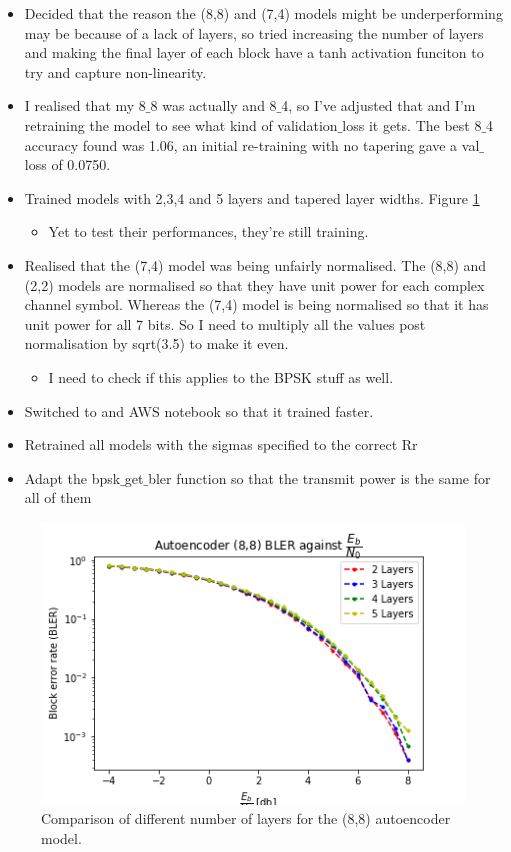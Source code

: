 \documentclass[12pt,onecolumn,letterpaper]{article}
\begin{document}
\begin{itemize}
   \item Decided that the reason the (8,8) and (7,4) models might be underperforming may be because of a lack of layers, so tried increasing the number of layers and making the final layer of each block have a tanh activation funciton to try and capture non-linearity.
   \item I realised that my 8$\_$8 was actually and 8$\_$4, so I've adjusted that and I'm retraining the model to see what kind of validation$\_$loss it gets. The best 8$\_$4 accuracy found was 1.06, an initial re-training with no tapering gave a val$\_$loss of 0.0750.
   \item Trained models with 2,3,4 and 5 layers and tapered layer widths. Figure \ref{fig:NumLayersBler}
   \begin{itemize}
      \item Yet to test their performances, they're still training.
   \end{itemize}
   \item Realised that the (7,4) model was being unfairly normalised. The (8,8) and (2,2) models are normalised so that they have unit power for each complex channel symbol. Whereas the (7,4) model is being normalised so that it has unit power for all 7 bits. So I need to multiply all the values post normalisation by sqrt(3.5) to make it even.
   \begin{itemize}
      \item I need to check if this applies to the BPSK stuff as well.
   \end{itemize}
   \item Switched to and AWS notebook so that it trained faster.
   \item Retrained all models with the sigmas specified to the correct Rr
   \item Adapt the bpsk$\_$get$\_$bler function so that the transmit power is the same for all of them
\end{itemize}

\begin{figure}[t]
   \centering
   \includegraphics[width=0.8\linewidth]{figures/autoencoder_8_8_bler_EbNo_2-5_layers.png}
   \caption{Comparison of different number of layers for the (8,8) autoencoder model.}
   \label{fig:NumLayersBler}
\end{figure}
\end{document}
